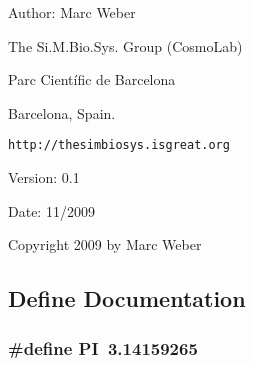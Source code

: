 \begin{Desc}
\item[Author:]Marc Weber\par
 The Si.M.Bio.Sys. Group (CosmoLab)\par
 Parc Científic de Barcelona\par
 Barcelona, Spain.\par
 {\tt http://thesimbiosys.isgreat.org} \end{Desc}
\begin{Desc}
\item[Version:]0.1 \end{Desc}
\begin{Desc}
\item[Date:]11/2009\end{Desc}
Copyright 2009 by Marc Weber 

\subsection{Define Documentation}
\subsubsection{\setlength{\rightskip}{0pt plus 5cm}\#define PI~3.14159265}\label{GraphicsCell_8h_598a3330b3c21701223ee0ca14316eca}


